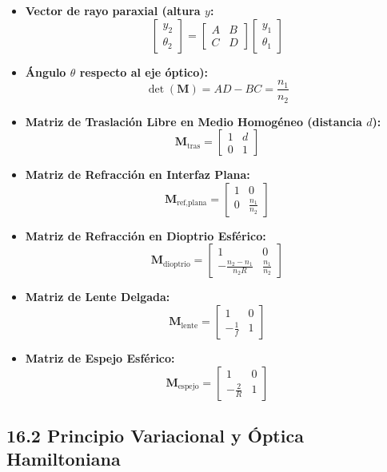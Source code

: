 \documentclass[11pt,a4paper]{article}
\begin{document}
\begin{itemize}
  \item \textbf{Vector de rayo paraxial (altura $y$:}
  \[
    \begin{bmatrix} y_2 \\ \theta_2 \end{bmatrix} = \begin{bmatrix} A & B \\ C & D \end{bmatrix} \begin{bmatrix} y_1 \\ \theta_1 \end{bmatrix}
  \]
  \item \textbf{Ángulo $\theta$ respecto al eje óptico):}
  \[
    \det\left( \mathbf{M} \right) = AD - BC = \frac{n_1}{n_2}
  \]
  \item \textbf{Matriz de Traslación Libre en Medio Homogéneo (distancia $d$):}
  \[
    \mathbf{M}_{\text{tras}} = \begin{bmatrix} 1 & d \\ 0 & 1 \end{bmatrix}
  \]
  \item \textbf{Matriz de Refracción en Interfaz Plana:}
  \[
    \mathbf{M}_{\text{ref,plana}} = \begin{bmatrix} 1 & 0 \\ 0 & \frac{n_1}{n_2} \end{bmatrix}
  \]
  \item \textbf{Matriz de Refracción en Dioptrio Esférico:}
  \[
    \mathbf{M}_{\text{dioptrio}} = \begin{bmatrix} 1 & 0 \\ -\frac{n_2 - n_1}{n_2 R} & \frac{n_1}{n_2} \end{bmatrix}
  \]
  \item \textbf{Matriz de Lente Delgada:}
  \[
    \mathbf{M}_{\text{lente}} = \begin{bmatrix} 1 & 0 \\ -\frac{1}{f} & 1 \end{bmatrix}
  \]
  \item \textbf{Matriz de Espejo Esférico:}
  \[
    \mathbf{M}_{\text{espejo}} = \begin{bmatrix} 1 & 0 \\ -\frac{2}{R} & 1 \end{bmatrix}
  \]
\end{itemize}

\subsection*{16.2 Principio Variacional y Óptica Hamiltoniana}
\end{document}
